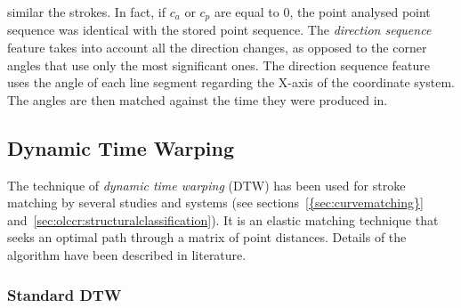 similar the strokes. In fact, if \( c_a \) or \( c_p \) are equal to \(0\),
the point analysed point sequence was identical with the stored point sequence.
The \emph{direction sequence} feature takes into account all the direction 
changes, as opposed to the corner angles that use only the most significant ones.
The direction sequence feature uses the angle of each line segment regarding the 
X-axis of the coordinate system. The angles are then matched against the time
they were produced in.
%

\subsection{Dynamic Time Warping}
\label{sec:hwre:dynamictimewarping}

The technique of \emph{dynamic time warping} (DTW) has been used for stroke 
matching by several studies and systems (see sections~\ref{{sec:curvematching}} 
and~\ref{sec:olccr:structuralclassification}).
It is an elastic matching technique that seeks an optimal path through
a matrix of point distances. Details of the algorithm have been described
in literature.

\subsubsection{Standard DTW}
\label{sec:hwre:standarddtw}

